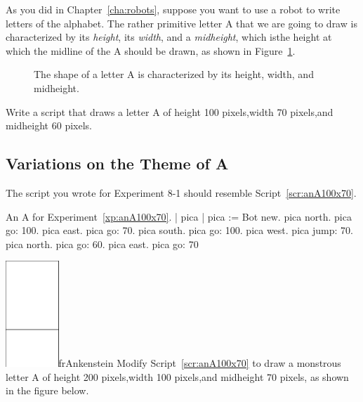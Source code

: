\documentclass[a4paper,10pt,twoside]{book}
\begin{document}
As you did in Chapter~\ref{cha:robots}, suppose you want to use a robot to write letters of the alphabet. The 
rather primitive letter A that we are going to draw is characterized by its \emph{height}, its \emph{width}, and a \emph{midheight}, which isthe height at which the midline of the A should be drawn, as shown in 
Figure~\ref{fig:varannotated}.

\begin{figure}
\caption{The shape of a letter A is characterized by its height, width, and midheight.\label{fig:varannotated}}
\end{figure}

\begin{exonofig}\label{xp:anA100x70}
Write a script that draws a letter A of height 100 pixels,width 70 pixels,and midheight 60 pixels.
\end{exonofig}


\subsection{Variations on the Theme of A} 

The script you wrote for Experiment 8-1 should resemble Script~\ref{scr:anA100x70}. 

\begin{script}[anA100x70]{An A for Experiment~\ref{xp:anA100x70}.}
| pica | 
pica := Bot new. 
pica north. 
pica go: 100. 
pica east. 
pica go: 70. 
pica south. 
pica go: 100. 
pica west. 
pica jump: 70. 
pica north. 
pica go: 60. 
pica east. 
pica go: 70 
\end{script}

\begin{exofigwithsizeandtitle}[0.7]{\includegraphics[width=2cm]{varA200}}{frAnkenstein}\label{xp:frankenstein}
Modify Script~\ref{scr:anA100x70} to draw a monstrous letter A of height 200 pixels,width 100 pixels,and midheight 70 pixels, as shown in the figure below.
\end{exofigwithsizeandtitle}
\end{document}
